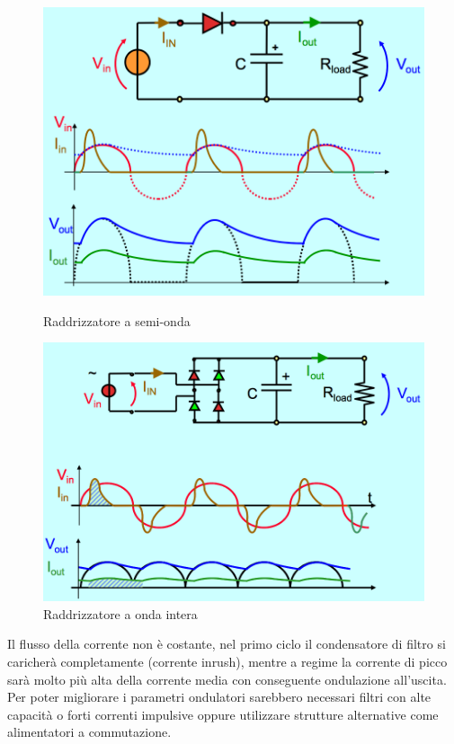 \documentclass[12pt]{article}
\begin{document}
\begin{figure}[!hbpt]
  \centering
  \begin{minipage}{.45\textwidth}
    \centering
    \includegraphics[width=\linewidth]{images/semi.png}
    \caption{Raddrizzatore a semi-onda}
    \label{fig:semi}
  \end{minipage}\hfill
  \begin{minipage}{.45\textwidth}
    \centering
    \includegraphics[width=\linewidth]{images/intera.png}
    \caption{Raddrizzatore a onda intera}
    \label{fig:intera}
  \end{minipage}\hfill
\end{figure}

Il flusso della corrente non è costante, nel primo ciclo il condensatore di filtro si caricherà completamente (corrente inrush), mentre a regime la corrente di picco sarà molto più alta della corrente media con conseguente ondulazione all'uscita. Per poter migliorare i parametri ondulatori sarebbero necessari filtri con alte capacità o forti correnti impulsive oppure utilizzare strutture alternative come alimentatori a commutazione.
\end{document}
